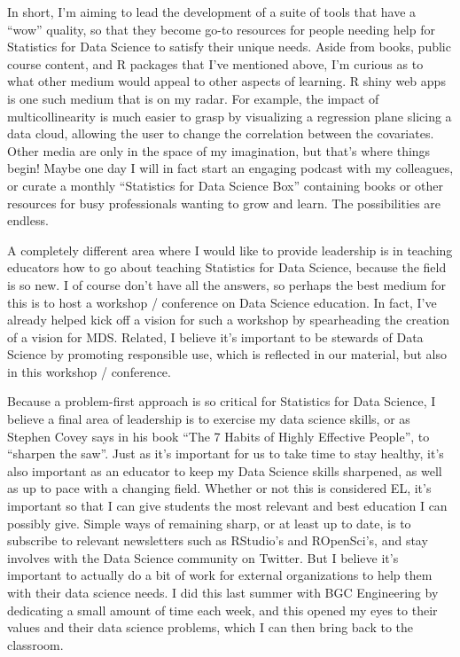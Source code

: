 \documentclass[]{article}
\begin{document}
In short, I'm aiming to lead the development of a suite of tools that have a ``wow'' quality, so that they become go-to resources for people needing help for Statistics for Data Science to satisfy their unique needs. Aside from books, public course content, and R packages that I've mentioned above, I'm curious as to what other medium would appeal to other aspects of learning. R shiny web apps is one such medium that is on my radar. For example, the impact of multicollinearity is much easier to grasp by visualizing a regression plane slicing a data cloud, allowing the user to change the correlation between the covariates. Other media are only in the space of my imagination, but that's where things begin! Maybe one day I will in fact start an engaging podcast with my colleagues, or curate a monthly ``Statistics for Data Science Box'' containing books or other resources for busy professionals wanting to grow and learn. The possibilities are endless.

A completely different area where I would like to provide leadership is in teaching educators how to go about teaching Statistics for Data Science, because the field is so new. I of course don't have all the answers, so perhaps the best medium for this is to host a workshop / conference on Data Science education. In fact, I've already helped kick off a vision for such a workshop by spearheading the creation of a vision for MDS. Related, I believe it's important to be stewards of Data Science by promoting responsible use, which is reflected in our material, but also in this workshop / conference.

Because a problem-first approach is so critical for Statistics for Data Science, I believe a final area of leadership is to exercise my data science skills, or as Stephen Covey says in his book ``The 7 Habits of Highly Effective People'', to ``sharpen the saw''. Just as it's important for us to take time to stay healthy, it's also important as an educator to keep my Data Science skills sharpened, as well as up to pace with a changing field. Whether or not this is considered EL, it's important so that I can give students the most relevant and best education I can possibly give. Simple ways of remaining sharp, or at least up to date, is to subscribe to relevant newsletters such as RStudio's and ROpenSci's, and stay involves with the Data Science community on Twitter. But I believe it's important to actually do a bit of work for external organizations to help them with their data science needs. I did this last summer with BGC Engineering by dedicating a small amount of time each week, and this opened my eyes to their values and their data science problems, which I can then bring back to the classroom.
\end{document}
